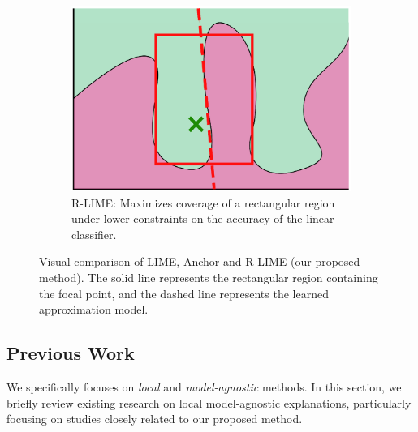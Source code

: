 \documentclass[11pt]{article}
\begin{document}
\begin{figure}[tbp]
\begin{subfigure}[t]{0.3\textwidth}
  \end{subfigure}
  \hspace{0.03\textwidth}
  \begin{subfigure}[t]{0.3\textwidth}
    \centering
    \includegraphics[width=\textwidth]{visual-rlime3}
    \caption{%
      R-LIME:
      Maximizes coverage of a rectangular region
      under lower constraints on the accuracy of the linear classifier.
    }\label{fig:rlime}
  \end{subfigure}
  \caption[Visual comparison of LIME, Anchor and R-LIME]{%
    Visual comparison of LIME, Anchor and R-LIME (our proposed method).
    The solid line represents the rectangular region containing the focal
    point, and the dashed line represents the learned approximation model.
  }
\end{figure}

\subsection{Previous Work}
We specifically focuses on \emph{local} and \emph{model-agnostic} methods.
In this section,
we briefly review existing research on local model-agnostic explanations,
particularly focusing on studies closely related to our proposed method.
\end{document}
